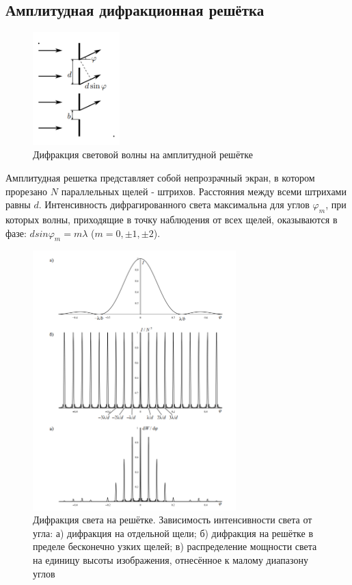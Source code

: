 \documentclass[a4paper, 12pt]{article}
\begin{document}
\subsection{Амплитудная дифракционная решётка}


\begin{figure}[H] %
    \centering
    \includegraphics[width=0.3\textwidth]{diff.png} %
    \caption{Дифракция
    световой волны на
    амплитудной решётке}
    \label{fig:example} %
\end{figure}
Амплитудная решетка представляет собой непрозрачный экран, в котором прорезано $N$ параллельных щелей - штрихов. Расстояния между всеми штрихами равны $d$. 
Интенсивность дифрагированного света максимальна для углов $\varphi_m$, при которых волны, приходящие в точку наблюдения от
всех щелей, оказываются в фазе: $d sin \varphi_m = m \lambda$ ($m = 0, \pm 1, \pm 2$).

\begin{figure}[H] %
    \centering
    \includegraphics[width=0.7\textwidth]{diff_2.png} %
    \caption{Дифракция света на решётке. Зависимость
        интенсивности света от угла: а) дифракция на отдельной щели;
        б) дифракция на решётке в пределе бесконечно узких щелей;
        в) распределение мощности света на единицу высоты изображения,
        отнесённое к малому диапазону углов}
    \label{fig:example} %
\end{figure}
\end{document}
